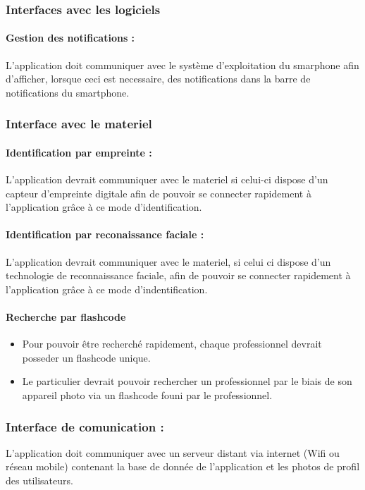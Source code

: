 \documentclass{article}
\begin{document}
\subsubsection{Interfaces avec les logiciels}
\paragraph{Gestion des notifications :}
L'application doit communiquer avec le système d'exploitation du
smarphone afin d'afficher, lorsque ceci est necessaire, des
notifications dans la barre de notifications du smartphone.

\subsubsection{Interface avec le materiel}
\paragraph{Identification par empreinte :}
L'application devrait communiquer avec le materiel si celui-ci dispose
d'un capteur d'empreinte digitale afin de pouvoir se connecter rapidement à
l'application grâce à ce mode d'identification.
\paragraph{Identification par reconaissance faciale :}
L'application devrait communiquer avec le materiel, si celui ci dispose
d'un technologie de reconnaissance faciale, afin de pouvoir se
connecter rapidement à l'application grâce à ce mode
d'indentification.
\paragraph{Recherche par flashcode}
\begin{itemize}
\item Pour pouvoir être recherché rapidement, chaque professionnel
  devrait posseder un flashcode unique.
\item Le particulier devrait pouvoir rechercher un professionnel par le
  biais de son appareil photo via un flashcode founi par le
  professionnel.
\end{itemize}

\subsubsection{Interface de comunication :}
L'application doit communiquer avec un serveur distant via internet
(Wifi ou réseau mobile) contenant la base de donnée de l'application et
les photos de profil des utilisateurs.
\end{document}
